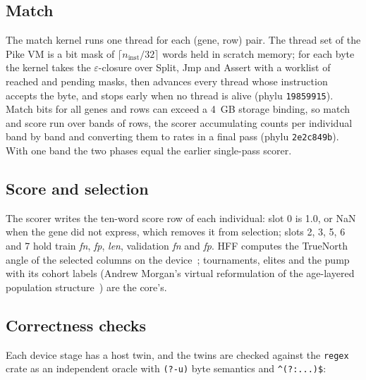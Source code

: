 \documentclass[sigconf,nonacm]{acmart}
\newcommand{\rx}{\lstinline[style=mono]}
\begin{document}
\subsection{Match}

The match kernel runs one thread for each (gene, row) pair. The thread set of the
Pike VM is a bit mask of $\lceil n_{\text{inst}}/32\rceil$ words held in scratch
memory; for each byte the kernel takes the $\varepsilon$-closure over
\textsf{Split}, \textsf{Jmp} and \textsf{Assert} with a worklist of reached and
pending masks, then advances every thread whose instruction accepts the byte,
and stops early when no thread is alive (phylu \texttt{19859915}). Match bits for
all genes and rows can exceed a 4~GB storage binding, so match and score run
over bands of rows, the scorer accumulating counts per individual band by band
and converting them to rates in a final pass (phylu \texttt{2e2c849b}). With one
band the two phases equal the earlier single-pass scorer.

\subsection{Score and selection}

The scorer writes the ten-word score row of each individual: slot 0 is 1.0, or NaN
when the gene did not express, which removes it from selection; slots 2, 3, 5, 6
and 7 hold train \textit{fn}, \textit{fp}, \textit{len}, validation \textit{fn} and
\textit{fp}. HFF computes the TrueNorth angle of the selected columns on the
device~\cite{morgan2026hff,morgan_core}; tournaments, elites and the pump with its
cohort labels (Andrew Morgan's virtual reformulation of the age-layered
population structure~\cite{hornby2006alps}) are the core's.

\subsection{Correctness checks}

Each device stage has a host twin, and the twins are checked against the
\texttt{regex} crate as an independent oracle with \texttt{(?-u)} byte semantics
and \rx!^(?:...)$!:
\end{document}
